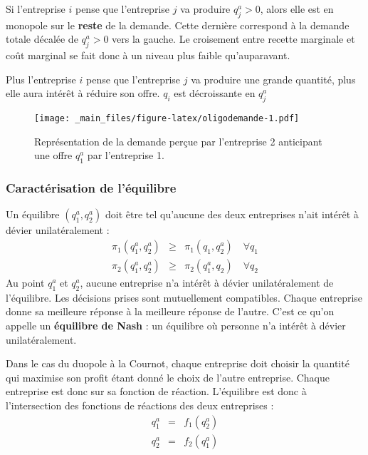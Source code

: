 \documentclass[
  a4paper,
]{book}
\theoremstyle{definition}
\theoremstyle{definition}
\theoremstyle{definition}
\theoremstyle{definition}
\theoremstyle{remark}
\begin{document}
Si l'entreprise \(i\) pense que l'entreprise \(j\) va produire \(q_j^a>0\), alors elle est en monopole sur le \textbf{reste} de la demande.
Cette dernière correspond à la demande totale décalée de \(q_j^a>0\) vers la gauche.
Le croisement entre recette marginale et coût marginal se fait donc à un niveau plus faible qu'auparavant.

Plus l'entreprise \(i\) pense que l'entreprise \(j\) va produire une grande quantité, plus elle aura intérêt à réduire son offre.
\(q_i\) est décroissante en \(q_j^a\)

\begin{figure}
\centering
\texttt{[image: \_main\_files/figure-latex/oligodemande-1.pdf]}
\caption{\label{fig:oligodemande}Représentation de la demande perçue par l'entreprise 2 anticipant une offre \(q_1^a\) par l'entreprise 1.}
\end{figure}

\hypertarget{caractuxe9risation-de-luxe9quilibre}{%
\subsubsection{Caractérisation de l'équilibre}\label{caractuxe9risation-de-luxe9quilibre}}

Un équilibre \((q_1^a, q_2^a)\) doit être tel qu'aucune des deux entreprises n'ait intérêt à dévier unilatéralement :
\[
\begin{array}{rcl}
\pi_1(q_1^a, q_2^a) &\geq& \pi_1(q_1, q_2^a)\quad \forall q_1\\
\pi_2(q_1^a, q_2^a) &\geq& \pi_2(q_1^a, q_2)\quad \forall q_2
\end{array}
\]
Au point \(q_1^a\) et \(q_2^a\), aucune entreprise n'a intérêt à dévier unilatéralement de l'équilibre.
Les décisions prises sont mutuellement compatibles.
Chaque entreprise donne sa meilleure réponse à la meilleure réponse de l'autre.
C'est ce qu'on appelle un \textbf{équilibre de Nash} : un équilibre où personne n'a intérêt à dévier unilatéralement.

Dans le cas du duopole à la Cournot, chaque entreprise doit choisir la quantité qui maximise son profit étant donné le choix de l'autre entreprise.
Chaque entreprise est donc sur sa fonction de réaction.
L'équilibre est donc à l'intersection des fonctions de réactions des deux entreprises :
\[
\begin{array}{rcl}
q_1^a&=&f_1(q_2^a)\\
q_2^a&=&f_2(q_1^a)
\end{array}
\]
\end{document}
